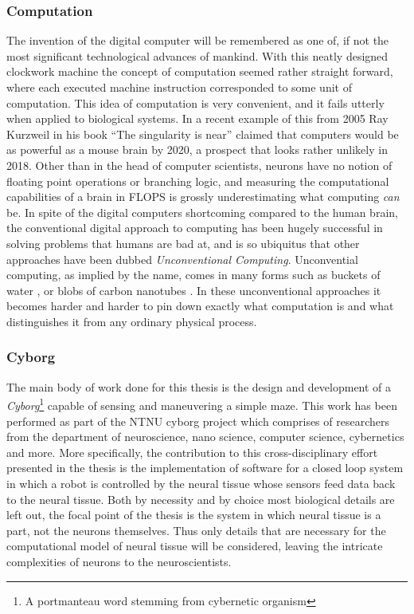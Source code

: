 \subsubsection{Computation}
The invention of the digital computer will be remembered as one of, if not the
most significant technological advances of mankind.
%
With this neatly designed clockwork machine the concept of computation seemed
rather straight forward, where each executed machine instruction corresponded to
some unit of computation.
%
This idea of computation is very convenient, and it fails utterly when
applied to biological systems.
In a recent example of this from 2005 \cite{kurzweil2005the}
Ray Kurzweil in his book ``The singularity is near''
claimed that computers would be as powerful as a
mouse brain by 2020, a prospect that looks rather unlikely in 2018.
Other than in the head of computer scientists, neurons have no notion of
floating point operations or branching logic, and measuring the computational
capabilities of a brain in FLOPS is grossly underestimating what computing
\emph{can} be.
%
In spite of the digital computers shortcoming compared to the human brain, the
conventional digital approach to computing has been hugely successful in solving
problems that humans are bad at, and is so ubiquitus that other approaches
have been dubbed \emph{Unconventional Computing}.
%
Unconvential computing, as implied by the name, comes in many forms such as
buckets of water \cite{fernando_pattern_2003}, or blobs of carbon nanotubes
\cite{carbon_nanotube_square}. 
%
In these unconventional approaches it becomes harder and harder to pin down
exactly what computation is and what distinguishes it from any ordinary physical
process.
%
\subsubsection{Cyborg}
The main body of work done for this thesis is the design and development of a
\emph{Cyborg}\footnote{A portmanteau word stemming from cybernetic organism}
capable of sensing and maneuvering a simple maze.
This work has been performed as part of the NTNU cyborg project \cite{ntnu_cyborg}
which comprises of researchers from the department of neuroscience, nano
science, computer science, cybernetics and more.
More specifically, the contribution to this cross-disciplinary effort presented
in the thesis is the implementation of software for a closed loop system in which a
robot is controlled by the neural tissue whose sensors feed data back to the neural
tissue.
Both by necessity and by choice most biological details are left out, the focal
point of the thesis is the system in which neural tissue is a part, not the
neurons themselves.
Thus only details that are necessary for the computational model of neural
tissue will be considered, leaving the intricate complexities of neurons to the
neuroscientists.
\cleardoublepage


